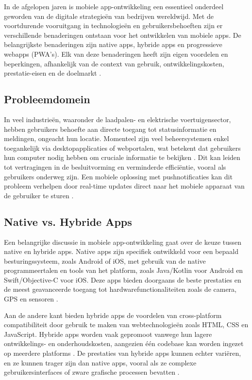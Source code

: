 \noindent In de afgelopen jaren is mobiele app-ontwikkeling een essentieel onderdeel geworden van de digitale strategieën van bedrijven wereldwijd. Met de voortdurende vooruitgang in technologieën en gebruikersbehoeften zijn er verschillende benaderingen ontstaan voor het ontwikkelen van mobiele apps. De belangrijkste benaderingen zijn native apps, hybride apps en progressieve webapps (PWA's). Elk van deze benaderingen heeft zijn eigen voordelen en beperkingen, afhankelijk van de context van gebruik, ontwikkelingskosten, prestatie-eisen en de doelmarkt \autocite{Lau2022}.

\subsection{Probleemdomein}
\noindent In veel industrieën, waaronder de laadpalen- en elektrische voertuigensector, hebben gebruikers behoefte aan directe toegang tot statusinformatie en meldingen, ongeacht hun locatie. Momenteel zijn veel beheersystemen enkel toegankelijk via desktopapplicaties of webportalen, wat betekent dat gebruikers hun computer nodig hebben om cruciale informatie te bekijken \autocite{Singh2024}. Dit kan leiden tot vertragingen in de besluitvorming en verminderde efficiëntie, vooral als gebruikers onderweg zijn. Een mobiele oplossing met pushnotificaties kan dit probleem verhelpen door real-time updates direct naar het mobiele apparaat van de gebruiker te sturen \autocite{Microsoft}.

\subsection{Native vs. Hybride Apps}
\noindent Een belangrijke discussie in mobiele app-ontwikkeling gaat over de keuze tussen native en hybride apps. Native apps zijn specifiek ontwikkeld voor een bepaald besturingssysteem, zoals Android of iOS, met gebruik van de native programmeertalen en tools van het platform, zoals Java/Kotlin voor Android en Swift/Objective-C voor iOS. Deze apps bieden doorgaans de beste prestaties en de meest geavanceerde toegang tot hardwarefunctionaliteiten zoals de camera, GPS en sensoren \autocite{Lau2022}.

\noindent Aan de andere kant bieden hybride apps de voordelen van cross-platform compatibiliteit door gebruik te maken van webtechnologieën zoals HTML, CSS en JavaScript. Hybride apps worden vaak gepromoot vanwege hun lagere ontwikkelings- en onderhoudskosten, aangezien één codebase kan worden ingezet op meerdere platforms \autocite{Singh2024}. De prestaties van hybride apps kunnen echter variëren, en ze kunnen trager zijn dan native apps, vooral als ze complexe gebruikersinterfaces of zware grafische processen bevatten \autocite{Wang2015}.

